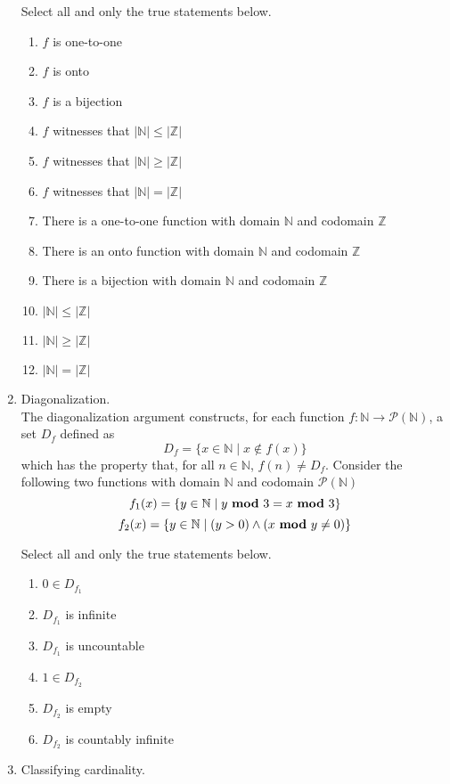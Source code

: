 \documentclass[12pt, oneside]{article}
\begin{document}
\begin{enumerate}
Select all and only the true statements below.
    \begin{enumerate}
        \item $f$ is one-to-one
        \item $f$ is onto
        \item $f$ is a bijection
        \item $f$ witnesses that $|\mathbb{N}| \leq |\mathbb{Z}|$
        \item $f$ witnesses that $|\mathbb{N}| \geq |\mathbb{Z}|$
        \item $f$ witnesses that $|\mathbb{N}| = |\mathbb{Z}|$
        \item There is a one-to-one function
        with domain $\mathbb{N}$ and codomain
        $\mathbb{Z}$
        \item There is an  onto function
        with domain $\mathbb{N}$ and codomain
        $\mathbb{Z}$
        \item There is a bijection
        with domain $\mathbb{N}$ and codomain
        $\mathbb{Z}$
    
        \item $|\mathbb{N}| \leq |\mathbb{Z}|$
        \item $|\mathbb{N}| \geq |\mathbb{Z}|$
        \item $|\mathbb{N}| = |\mathbb{Z}|$
    \end{enumerate}     \item Diagonalization. \hspace{1in}\\ 

The diagonalization argument constructs, 
for each function $f:  \mathbb{N} \to  \mathcal{P}(\mathbb{N})$, a set  $D_f$ defined
as
\[
D_f = \{ x \in \mathbb{N} \mid x \notin  f(x) \}
\]
which has the property  that,  for all  $n \in \mathbb{N}$, $f(n) \neq  D_f$.
Consider the following two functions with  domain $\mathbb{N}$ and codomain $\mathcal{P}(\mathbb{N})$
\[
f_1(x) =  \{  y \in  \mathbb{N} \mid y~\text{\bf mod}~3 = x~\text{\bf mod}~3  \}
\]
\[
f_2(x) =  \{  y \in  \mathbb{N} \mid (y > 0) \land
(x ~\text{\bf mod}~y \neq  0)\}
\]

Select all and only the true statements below.
\begin{enumerate}
    \item $0 \in D_{f_1}$
    \item $D_{f_1}$ is infinite
    \item $D_{f_1}$ is uncountable
    \item $1 \in D_{f_2}$
    \item $D_{f_2}$ is empty
    \item $D_{f_2}$ is countably infinite
\end{enumerate}     \item Classifying cardinality. \hspace{1in}\\ 


\end{enumerate}
\end{document}
